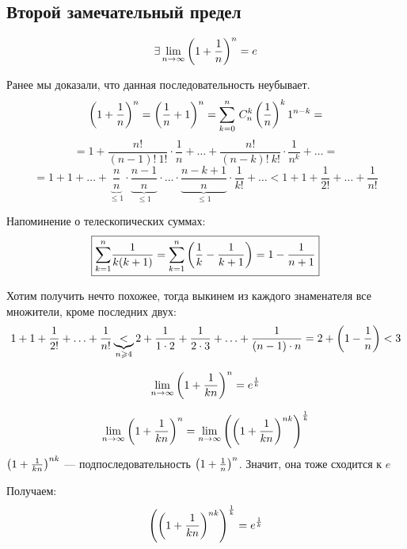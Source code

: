 \subsection{Второй замечательный предел}
\begin{theorem}
    $$ \exists \Lim{n}{\infty} \l(1 + \frac{1}{n}\r)^n = e $$
\end{theorem}

\begin{Proof}
    Ранее мы доказали, что данная последовательность неубывает.
    $$ \l(1 + \frac{1}{n}\r)^n = \l(\frac{1}{n} + 1\r)^n = \Sum{k = 0}{n} \ C^k_n \l(\frac{1}{n}\r)^k 1^{n-k} =$$
    $$ = 1 + \frac{n!}{(n-1)!\ 1!} \cdot \frac{1}{n} + \ldots + \frac{n!}{(n-k)!\ k!} \cdot \frac{1}{n^k} + \ldots = $$
    $$ = 1 + 1 + \ldots + \underbrace{\frac{n}{n}}_{\leq 1} \cdot \underbrace{\frac{n-1}{n}}_{\leq 1} \cdot \ldots \cdot \underbrace{\frac{n - k + 1}{n}}_{\leq 1} \cdot \frac{1}{k!} + \ldots < 1 + 1 + \frac{1}{2!} + \ldots + \frac{1}{n!} $$

    Напоминение о телескопических суммах:
    $$
    \boxed{
    \begin{aligned}
        \Sum{k=1}{n} \frac{1}{k(k+1)} = \Sum{k=1}{n} \l(\frac{1}{k} - \frac{1}{k+1} \r) = 1 - \frac{1}{n+1}
    \end{aligned}
    }$$

    Хотим получить нечто похожее, тогда выкинем из каждого знаменателя все множители, кроме последних двух:
    $$ 1 + 1 + \frac{1}{2!} + \ldots + \frac{1}{n!} \underbrace{<}_{n \geq 4} 2 + \frac{1}{1 \cdot 2} + \frac{1}{2 \cdot 3} + \ldots + \frac{1}{(n - 1) \cdot n} = 2 + \l(1 - \frac{1}{n} \r) < 3 $$
\end{Proof}

\begin{consequence}
    $$ \Lim{n}{\infty} \l(1 + \frac{1}{kn}\r)^n = e^{\frac{1}{k}} $$
\end{consequence}

\begin{Proof}
    $$ \Lim{n}{\infty} \l(1 + \frac{1}{kn}\r)^n 
    = \Lim{n}{\infty} \l(\l(1 + \frac{1}{kn}\r)^{nk}\r)^{\frac{1}{k}} $$
    $ \l(1 + \frac{1}{kn}\r)^{nk} $ --- подпоследовательность $ \l(1 + \frac{1}{n}\r)^{n} $. Значит, она тоже сходится к $e$

    Получаем:
    $$ \l(\l(1 + \frac{1}{kn}\r)^{nk}\r)^{\frac{1}{k}} = e^{\frac{1}{k}} $$
\end{Proof}
